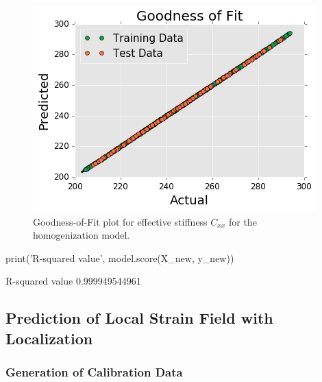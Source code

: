 \documentclass{bmcart}
\newcommand{\fimage}
{\fcolorbox{outcolor}{white}}
{}
\begin{document}
\begin{figure}
    \centering
    \includegraphics[scale=.85]{pymks_paper_homogenization_files/pymks_paper_homogenization_25_0.png}
    \caption{Goodness-of-Fit plot for effective stiffness $C_{xx}$ for the homogenization model.}
    \label{fig:drawGoodnessOfFit}
\end{figure}

    
\begin{_input}
print('R-squared value', model.score(X_new, y_new))
\end{_input}
\begin{_output}
R-squared value 0.999949544961
\end{_output}

\subsection{Prediction of Local Strain Field with
Localization}\label{prediction-of-local-strain-field-with-localization}

\subsubsection{Generation of Calibration Data}\label{calibration-data-generation}
\end{document}
